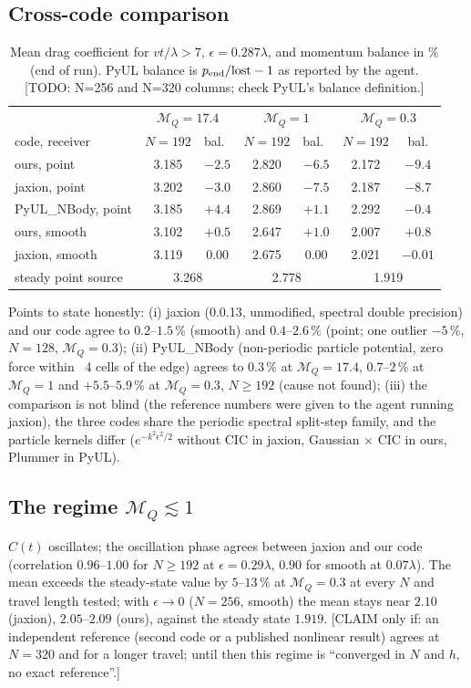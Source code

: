 \documentclass[11pt]{article}
\newcommand{\todo}[1]{{\color{red}[TODO: #1]}}
\newcommand{\claim}[1]{{\color{blue}[CLAIM only if: #1]}}
\newcommand{\MQ}{\mathcal{M}_Q}
\begin{document}
\subsection{Cross-code comparison}
\begin{table}[h]\centering\small
\begin{tabular}{lcccccc}\toprule
 & \multicolumn{2}{c}{$\MQ=17.4$} & \multicolumn{2}{c}{$\MQ=1$} & \multicolumn{2}{c}{$\MQ=0.3$}\\
 code, receiver & $N{=}192$ & bal.\ & $N{=}192$ & bal.\ & $N{=}192$ & bal.\\\midrule
 ours, point        & 3.185 & $-2.5$ & 2.820 & $-6.5$ & 2.172 & $-9.4$\\
 jaxion, point      & 3.202 & $-3.0$ & 2.860 & $-7.5$ & 2.187 & $-8.7$\\
 PyUL\_NBody, point & 3.185 & $+4.4$ & 2.869 & $+1.1$ & 2.292 & $-0.4$\\
 ours, smooth       & 3.102 & $+0.5$ & 2.647 & $+1.0$ & 2.007 & $+0.8$\\
 jaxion, smooth     & 3.119 & $0.00$ & 2.675 & $0.00$ & 2.021 & $-0.01$\\\midrule
 steady point source & \multicolumn{2}{c}{3.268} & \multicolumn{2}{c}{2.778} & \multicolumn{2}{c}{1.919}\\\bottomrule
\end{tabular}
\caption{Mean drag coefficient for $vt/\lambda>7$, $\epsilon=0.287\lambda$, and momentum balance in \% (end of run). PyUL balance is $p_{\rm end}/{\rm lost}-1$ as reported by the agent. \todo{N=256 and N=320 columns; check PyUL's balance definition.}}
\end{table}
Points to state honestly: (i) jaxion (0.0.13, unmodified, spectral double precision) and our code agree to $0.2$--$1.5\,\%$ (smooth) and $0.4$--$2.6\,\%$ (point; one outlier $-5\,\%$, $N=128$, $\MQ=0.3$);
(ii) PyUL\_NBody (non-periodic particle potential, zero force within ~4 cells of the edge) agrees to $0.3\,\%$ at $\MQ=17.4$, $0.7$--$2\,\%$ at $\MQ=1$ and $+5.5$--$5.9\,\%$ at $\MQ=0.3$, $N\ge192$ (cause not found);
(iii) the comparison is not blind (the reference numbers were given to the agent running jaxion), the three codes share the periodic spectral split-step family, and the particle kernels differ ($e^{-k^2\epsilon^2/2}$ without CIC in jaxion, Gaussian $\times$ CIC in ours, Plummer in PyUL).
\subsection{The regime $\MQ\lesssim1$}
$C(t)$ oscillates; the oscillation phase agrees between jaxion and our code (correlation $0.96$--$1.00$ for $N\ge192$ at $\epsilon=0.29\lambda$, $0.90$ for smooth at $0.07\lambda$).
The mean exceeds the steady-state value by $5$--$13\,\%$ at $\MQ=0.3$ at every $N$ and travel length tested; with $\epsilon\to0$ ($N=256$, smooth) the mean stays near $2.10$ (jaxion), $2.05$--$2.09$ (ours), against the steady state $1.919$.
\claim{an independent reference (second code or a published nonlinear result) agrees at $N=320$ and for a longer travel; until then this regime is ``converged in $N$ and $h$, no exact reference''.}
\end{document}
